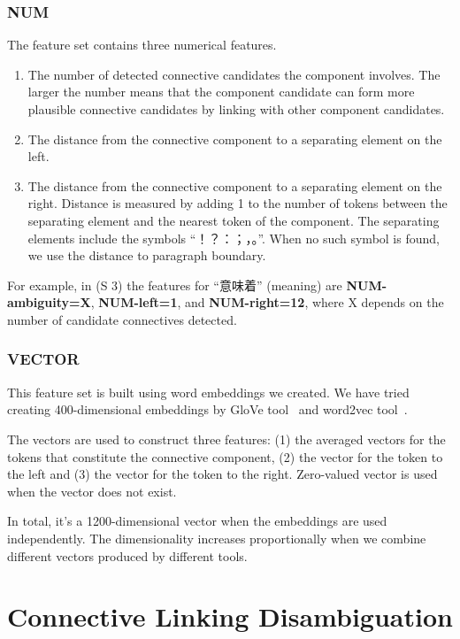 \subsubsection{NUM}

The feature set contains three numerical features.

\begin{enumerate}
    \item The number of detected connective candidates the component involves. The larger
        the number means that the component candidate can form more plausible connective
        candidates by linking with other component candidates.
    \item The distance from the connective component to a separating element on the left.
    \item The distance from the connective component to a
        separating element on the right. Distance is measured by adding 1 to the number of tokens
        between the separating element and the nearest token of the component.
        The separating elements include the symbols ``！？：；，。''.
        When no such symbol is found, we use the distance to paragraph boundary.
\end{enumerate}

For example, in (S 3) the features for “意味着” (meaning) are \textbf{NUM-ambiguity=X},
\textbf{NUM-left=1}, and \textbf{NUM-right=12}, where X depends on the number of candidate
connectives detected.


\subsubsection{VECTOR}

This feature set is built using word embeddings we created.
We have tried creating 400-dimensional embeddings by GloVe tool~\citep{pennington2014glove}
and word2vec tool~\citep{mikolov2013efficient,mikolov2013distributed}.

The vectors are used to construct three features: (1) the averaged vectors
for the tokens that constitute the connective component, (2) the vector for the
token to the left and (3) the vector for the token to the right. Zero-valued vector is used
when the vector does not exist.

In total, it's a 1200-dimensional vector when the embeddings are used independently.
The dimensionality increases proportionally when we combine different vectors produced by
different tools.


\section{Connective Linking Disambiguation}

